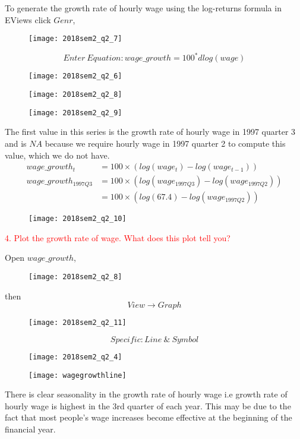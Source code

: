 \documentclass[12pt]{report}
\begin{document}
\noindent To generate the growth rate of hourly wage using the log-returns formula in EViews click $Genr$,
\begin{figure}[H]
	\centerline{\texttt{[image: 2018sem2\_q2\_7]}}
\end{figure}
\vspace{-\baselineskip}
$$Enter\ Equation: wage\_growth = 100^*dlog(wage)$$
\begin{figure}[H]
	\centerline{\texttt{[image: 2018sem2\_q2\_6]}}
\end{figure}
\vspace{-\baselineskip}
\begin{figure}[H]
	\centerline{\texttt{[image: 2018sem2\_q2\_8]}}
\end{figure}
\vspace{-\baselineskip}
\begin{figure}[H]
	\centerline{\texttt{[image: 2018sem2\_q2\_9]}}
\end{figure}
\vspace{-\baselineskip} \noindent The first value in this series is the growth rate of hourly wage in 1997 quarter 3 and is $NA$ because we require hourly wage in 1997 quarter 2 to compute this value, which we do not have. \begin{align*}
wage\_growth_t &= 100 \times (log(wage_t) - log(wage_{t-1})) \\
wage\_growth_{1997Q3} &= 100 \times (log(wage_{1997Q3}) - log(wage_{1997Q2})) \\
&= 100 \times (log(67.4) - log(wage_{1997Q2}))
\end{align*}
\begin{figure}[H]
	\centerline{\texttt{[image: 2018sem2\_q2\_10]}}
\end{figure}

\newpage
\noindent \textcolor{red}{4. Plot the growth rate of wage. What does this plot tell you?}

\noindent Open $wage\_growth$, \begin{figure}[H]
	\centerline{\texttt{[image: 2018sem2\_q2\_8]}}
\end{figure}
\vspace{-\baselineskip} then $$View \to Graph$$ \begin{figure}[H]
	\centerline{\texttt{[image: 2018sem2\_q2\_11]}}
\end{figure}
\vspace{-\baselineskip} $$Specific: Line\ \&\ Symbol$$
\begin{figure}[H]
	\centerline{\texttt{[image: 2018sem2\_q2\_4]}}
\end{figure}
\vspace{-\baselineskip}
\begin{figure}[H]
	\centerline{\texttt{[image: wagegrowthline]}}
\end{figure}
\vspace{-\baselineskip} \noindent There is clear seasonality in the growth rate of hourly wage i.e growth rate of hourly wage is highest in the 3rd quarter of each year. This may be due to the fact that most people's wage increases become effective at the beginning of the financial year.
\end{document}
